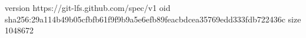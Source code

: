 version https://git-lfs.github.com/spec/v1
oid sha256:29a114b49b05cfbfb61f9f9b9a5e6efb89feacbdcea35769edd333fdb722436c
size 1048672
